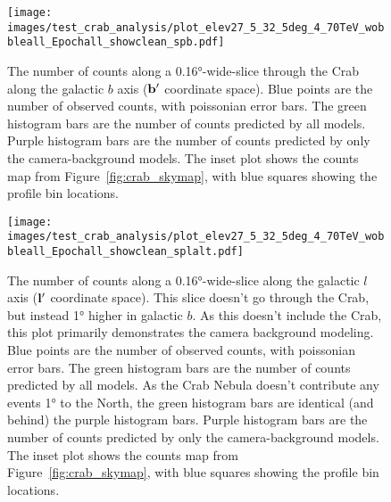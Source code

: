   \begin{figure}[h]
    \centering
    \texttt{[image: images/test\_crab\_analysis/plot\_elev27\_5\_32\_5deg\_4\_70TeV\_wobbleall\_Epochall\_showclean\_spb.pdf]}
    \caption[Crab Profile along Galactic $b$]
    {
      The number of counts along a \ang{0.16}-wide-slice through the Crab along the galactic $b$ axis ($\mathbf{b'}$ coordinate space).
      Blue points are the number of observed counts, with poissonian error bars.
      The green histogram bars are the number of counts predicted by all models.
      Purple histogram bars are the number of counts predicted by only the camera-background models.
      The inset plot shows the counts map from Figure~\ref{fig:crab_skymap}, with blue squares showing the profile bin locations.
    }
    \label{fig:crab_profile_b}
  \end{figure}
    
  \begin{figure}[h]
    \centering
    \texttt{[image: images/test\_crab\_analysis/plot\_elev27\_5\_32\_5deg\_4\_70TeV\_wobbleall\_Epochall\_showclean\_splalt.pdf]}
    \caption[Crab Profile along Galactic $l$ Off Source]
    {
      The number of counts along a \ang{0.16}-wide-slice along the galactic $l$ axis ($\mathbf{l'}$ coordinate space).
      This slice doesn't go through the Crab, but instead \ang{1} higher in galactic $b$.
      As this doesn't include the Crab, this plot primarily demonstrates the camera background modeling.
      Blue points are the number of observed counts, with poissonian error bars.
      The green histogram bars are the number of counts predicted by all models.
      As the Crab Nebula doesn't contribute any events \ang{1} to the North, the green histogram bars are identical (and behind) the purple histogram bars.
      Purple histogram bars are the number of counts predicted by only the camera-background models.
      The inset plot shows the counts map from Figure~\ref{fig:crab_skymap}, with blue squares showing the profile bin locations.
    }
    \label{fig:crab_profile_l_off}
  \end{figure}

